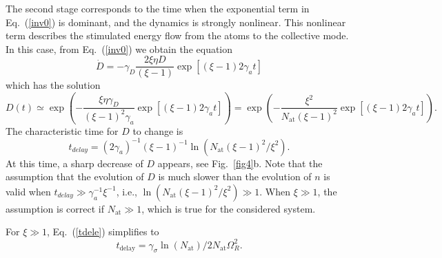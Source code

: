 \documentclass[aps,pra,amsmath,amssymb,onecolumn,superscriptaddress,showpacs,floatfix,]{revtex4-1}
\begin{document}
The second stage corresponds to the time when the exponential term in Eq.~(\ref{inv0}) is dominant, and the dynamics is strongly nonlinear.
This nonlinear term describes the stimulated energy flow from the atoms to the collective mode.
In this case, from Eq.~(\ref{inv0}) we obtain the equation
\begin{equation} 
\dot D =  - {\gamma _D}\frac{{2\xi \eta D}}{{\left( {\xi  - 1} \right)}} \exp \left[\left( {\xi  - 1} \right) 2 {\gamma _a}t \right] \label{invnl1}
\end{equation}
which has the solution
\begin{equation} 
D(t) \simeq \exp \left(  - \frac{{\xi \eta {\gamma _D}}}{{{\left( {\xi  - 1} \right)}^2}{\gamma _a}}  \exp \left[\left( {\xi  - 1} \right) 2 {\gamma _a}t \right] \right) = \exp \left(  - \frac{{{\xi ^2}}}{{{N_{\text{at}}}{{\left( {\xi  - 1} \right)}^2}}}\exp \left[\left( {\xi  - 1} \right) 2 {\gamma _a}t \right] \right).
\end{equation}
The characteristic time for $D$ to change is 
\begin{equation} 
{t_{delay}} = (2\gamma _a)^{ - 1}{\left( {\xi  - 1} \right)^{ - 1}}\ln \left( {{N_{\text{at}}}{{\left( {\xi - 1} \right)}^2}/{\xi ^2}} \right). \label{tdele}
\end{equation}
At this time, a sharp decrease of $D$ appears, see Fig.~\ref{fig4}b.
Note that the assumption that the evolution of $D$ is much slower than the evolution of $n$ is valid when $t_{delay} \gg \gamma_a^{-1} \xi^{-1}$, i.e., $\ln \left( {{N_{\text{at}}}{{\left( {\xi  - 1} \right)}^2}/{\xi ^2}} \right) \gg 1$.
When $\xi \gg 1$, the assumption is correct if $N_{\text{at}} \gg 1$, which is true for the considered system.

For $\xi \gg 1$, Eq.~(\ref{tdele}) simplifies to  
\begin{equation} 
{t_{\text{delay}}} = {\gamma _\sigma }\ln \left( {{N_{\text{at}}}} \right)/2{N_{\text{at}}}\Omega _R^2. \label{tdel}
\end{equation}
\end{document}

